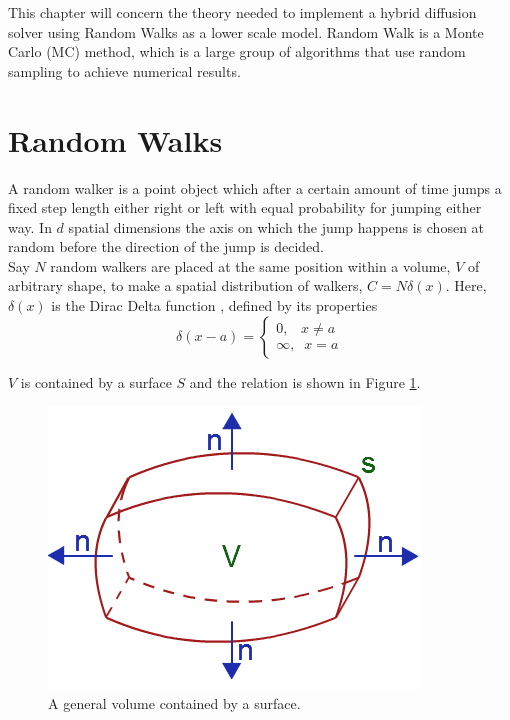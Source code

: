 This chapter will concern the theory needed to implement a hybrid diffusion solver using Random Walks as a lower scale model. 
Random Walk is a Monte Carlo (MC) method, which is a large group of algorithms that use random sampling to achieve numerical results. 



\section{Random Walks}
A random walker is a point object which after a certain amount of time jumps a fixed step length either right or left with equal probability for jumping either way. 
In $d$ spatial dimensions the axis on which the jump happens is chosen at random before the direction of the jump is decided. \\
Say $N$ random walkers are placed at the same position within a volume, $V$ of arbitrary shape, to make a spatial distribution of walkers, $C = N\delta(x)$. 
Here, $\delta(x)$ is the Dirac Delta function \cite{boas2006mathematical}, defined by its properties
\begin{equation}
 \delta(x-a) = \begin{cases}
              0 ,\;\;\; x\neq a\\
              \infty,\;\; x=a
             \end{cases}
\end{equation}

\noindent $V$ is contained by a surface $S$ and the relation is shown in Figure \ref{theory:divergence_theorem}. 

\begin{figure}[H]
\centering
\includegraphics[scale=0.6]{Figures/divergence_theorem.png}
 \caption{A general volume contained by a surface.}
 \label{theory:divergence_theorem}
\end{figure}

